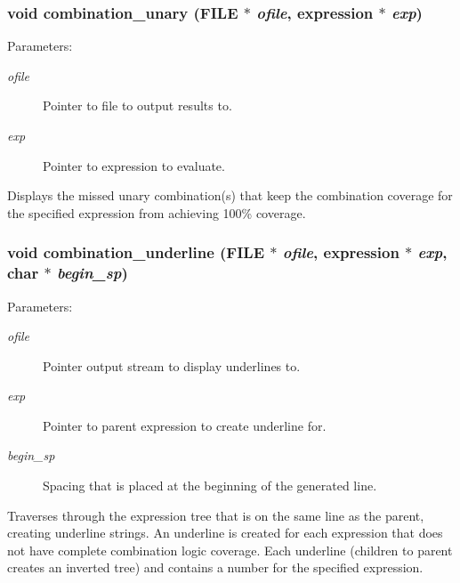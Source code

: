\subsubsection{\setlength{\rightskip}{0pt plus 5cm}void combination\_\-unary (FILE $\ast$ {\em ofile}, {\bf expression} $\ast$ {\em exp})}\label{comb_8c_a8}


\begin{Desc}
\item[Parameters: ]\par
\begin{description}
\item[{\em 
ofile}]Pointer to file to output results to. \item[{\em 
exp}]Pointer to expression to evaluate.\end{description}
\end{Desc}
Displays the missed unary combination(s) that keep the combination coverage for the specified expression from achieving 100\% coverage. 
\subsubsection{\setlength{\rightskip}{0pt plus 5cm}void combination\_\-underline (FILE $\ast$ {\em ofile}, {\bf expression} $\ast$ {\em exp}, char $\ast$ {\em begin\_\-sp})}\label{comb_8c_a7}


\begin{Desc}
\item[Parameters: ]\par
\begin{description}
\item[{\em 
ofile}]Pointer output stream to display underlines to. \item[{\em 
exp}]Pointer to parent expression to create underline for. \item[{\em 
begin\_\-sp}]Spacing that is placed at the beginning of the generated line.\end{description}
\end{Desc}
Traverses through the expression tree that is on the same line as the parent, creating underline strings. An underline is created for each expression that does not have complete combination logic coverage. Each underline (children to parent creates an inverted tree) and contains a number for the specified expression. 
